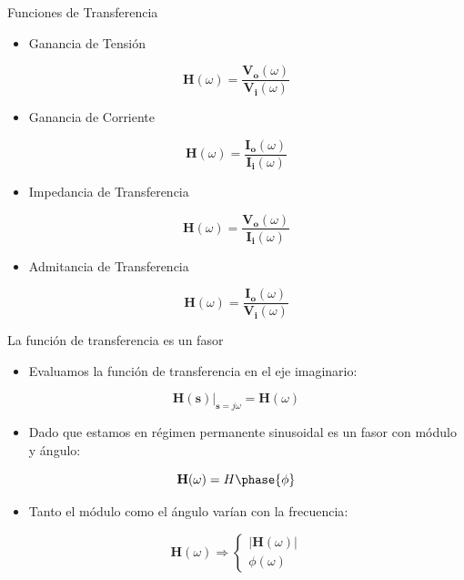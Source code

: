\documentclass[aspectratio=169, usenames,svgnames,dvipsnames]{beamer}
\newcommand{\laplace}[1]{\mathbf{#1}(\mathbf{s})}
\newcommand{\slp}{\mathbf{s}}
\newcommand{\fasor}[1]{\mathbf{#1}(\omega)}
\begin{document}
\begin{frame}[label={sec:org9e8a597}]{Funciones de Transferencia}
\begin{itemize}
\item Ganancia de Tensión
\end{itemize}
\[
\fasor{H} =\frac{\fasor{V_o}}{\fasor{V_i}}
\]
\begin{itemize}
\item Ganancia de Corriente
\end{itemize}
\[
\fasor{H} =\frac{\fasor{I_o}}{\fasor{I_i}}
\]
\begin{itemize}
\item Impedancia de Transferencia
\end{itemize}
\[
\fasor{H} =\frac{\fasor{V_o}}{\fasor{I_i}}
\]
\begin{itemize}
\item Admitancia de Transferencia
\end{itemize}
\[
\fasor{H} =\frac{\fasor{I_o}}{\fasor{V_i}}
\]
\end{frame}

\begin{frame}[label={sec:orgf52a158}]{La función de transferencia es un fasor}
\begin{itemize}
\item Evaluamos la función de transferencia en el eje imaginario:
\end{itemize}
\[
\laplace{H}\rvert_{\slp = j\omega} = \fasor{H} 
\]
\begin{itemize}
\item Dado que estamos en régimen permanente sinusoidal es \alert{un fasor con módulo y ángulo}:
\end{itemize}
\[
\fasor{H} = H\phase{\phi}
\]

\begin{itemize}
\item Tanto el módulo como el ángulo \alert{varían con la frecuencia}:
\end{itemize}

\[
\fasor{H} \Rightarrow
\begin{cases} 
  |\fasor{H}|\\
  \phi(\omega)
\end{cases}
\]
\end{frame}
\end{document}
